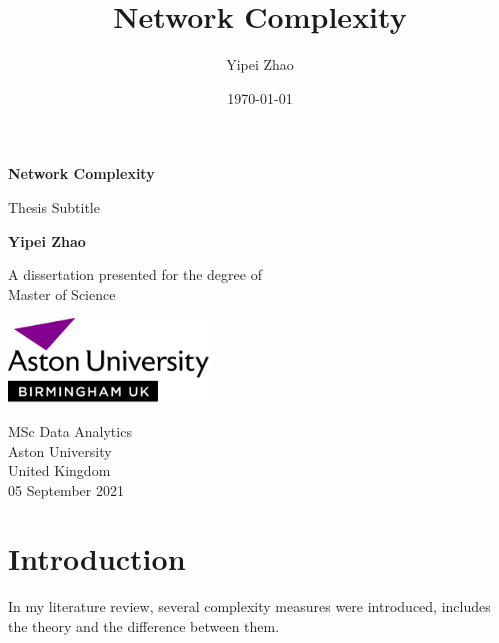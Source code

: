 \documentclass[12pt]{article}
\title{Network Complexity}
\author{Yipei Zhao}
\date{\today}
\begin{document}
\begin{titlepage}
    \begin{center}
        \vspace*{1cm}
            
        \Huge
        \textbf{Network Complexity}
            
        \vspace{0.5cm}
        \LARGE
        Thesis Subtitle
            
        \vspace{1.5cm}
            
        \textbf{Yipei Zhao}
            
        \vfill
            
        A dissertation presented for the degree of\\
        Master of Science
            
        \vspace{0.8cm}
            
        \includegraphics[width=0.4\textwidth]{university.png}
            
        \Large
        MSc Data Analytics\\
        Aston University\\
        United Kingdom\\
        05 September 2021
            
    \end{center}
\end{titlepage}
\section{Introduction}
In my literature review, several complexity measures were introduced, includes the theory and the difference between them. 
\end{document}
